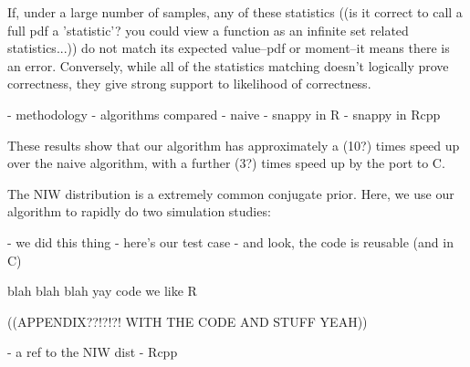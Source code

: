 \documentclass[english]{report}
\begin{document}
If, under a large number of samples, any of these statistics ((is it correct to call a full pdf a 'statistic'? you could view a function as an infinite set related statistics...)) do not match its expected value--pdf or moment--it means there is an error. Conversely, while all of the statistics matching doesn't logically prove correctness, they give strong support to likelihood of correctness.




- methodology
- algorithms compared
  - naive
  - snappy in R
  - snappy in Rcpp

These results show that our algorithm has approximately a (10?) times speed up over the naive algorithm, with a further (3?) times speed up by the port to C.


The NIW distribution is a extremely common conjugate prior. Here, we use our algorithm to rapidly do two simulation studies:




- we did this thing
- here's our test case
- and look, the code is reusable (and in C)


blah blah blah yay code we like R

((APPENDIX??!?!?! WITH THE CODE AND STUFF YEAH))

\newpage
{}

- a ref to the NIW dist
- Rcpp
\end{document}
